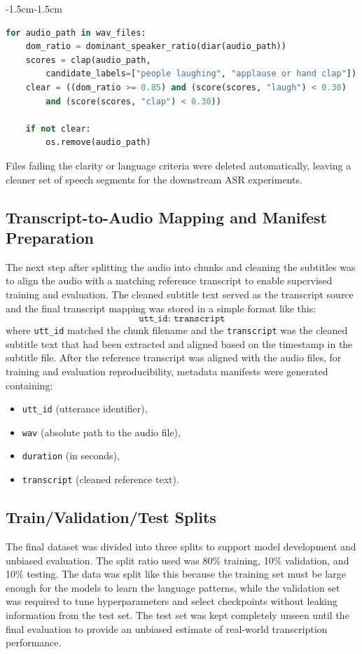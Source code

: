 \begin{adjustwidth}{-1.5cm}{-1.5cm}
\begin{lstlisting}[language=Python, breaklines=true, basicstyle=\ttfamily\small,
caption={Automatic audio quality filtering}, label={lst:audio-filter}]
for audio_path in wav_files:
    dom_ratio = dominant_speaker_ratio(diar(audio_path))
    scores = clap(audio_path,
        candidate_labels=["people laughing", "applause or hand clap"])
    clear = ((dom_ratio >= 0.85) and (score(scores, "laugh") < 0.30)
        and (score(scores, "clap") < 0.30))

    if not clear:
        os.remove(audio_path)
\end{lstlisting}
\end{adjustwidth}

Files failing the clarity or language criteria were deleted automatically, leaving a cleaner set of speech segments for the downstream ASR experiments.

\subsection{Transcript-to-Audio Mapping and Manifest Preparation}
The next step after splitting the audio into chunks and cleaning the subtitles was to align the audio with a matching reference transcript to enable supervised training and evaluation. The cleaned subtitle text served as the transcript source and the final transcript mapping was stored in a simple format like this:
\[
\texttt{utt\_id: transcript}
\]
where \texttt{utt\_id} matched the chunk filename and the \texttt{transcript} was the cleaned subtitle text that had been extracted and aligned based on the timestamp in the subtitle file. After the reference transcript was aligned with the audio files, for training and evaluation reproducibility, metadata manifests were generated containing:
\begin{itemize}[nosep]
    \item \texttt{utt\_id} (utterance identifier),
    \item \texttt{wav} (absolute path to the audio file),
    \item \texttt{duration} (in seconds),
    \item \texttt{transcript} (cleaned reference text).
\end{itemize}

\subsection{Train/Validation/Test Splits}
The final dataset was divided into three splits to support model development and unbiased evaluation. The split ratio used was 80\% training, 10\% validation, and 10\% testing. The data was split like this because the training set must be large enough for the models to learn the language patterns, while the validation set was required to tune hyperparameters and select checkpoints without leaking information from the test set. The test set was kept completely unseen until the final evaluation to provide an unbiased estimate of real-world transcription performance.

